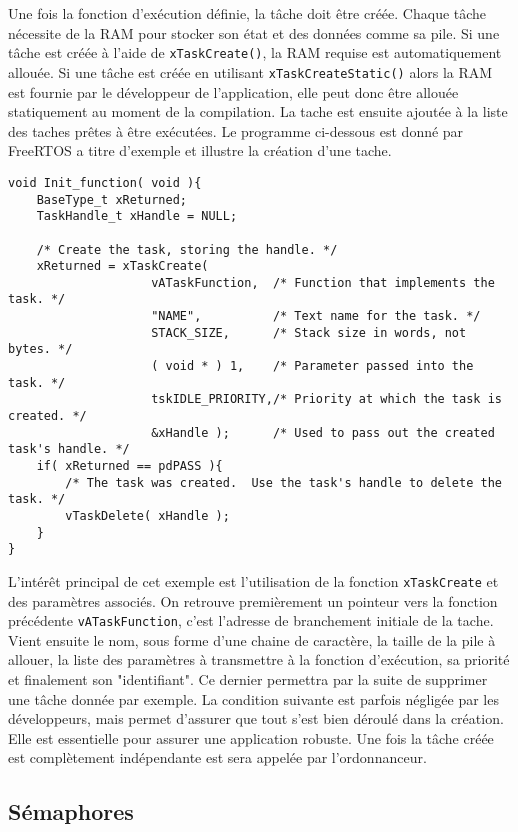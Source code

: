 Une fois la fonction d'exécution définie, la tâche doit être créée.
Chaque tâche nécessite de la RAM pour stocker son état et des données comme sa pile. 
Si une tâche est créée à l'aide de \texttt{xTaskCreate()}, la RAM requise est automatiquement allouée. 
Si une tâche est créée en utilisant \texttt{xTaskCreateStatic()} alors la RAM est fournie par le développeur de l'application, elle peut donc être allouée statiquement au moment de la compilation.
La tache est ensuite ajoutée à la liste des taches prêtes à être exécutées.
Le programme ci-dessous est donné par FreeRTOS \cite{web_freeRTOS_createTask} a titre d'exemple et illustre la création d'une tache.
\begin{lstlisting}[style=CStyle]
void Init_function( void ){
    BaseType_t xReturned;
    TaskHandle_t xHandle = NULL;

    /* Create the task, storing the handle. */
    xReturned = xTaskCreate(
                    vATaskFunction,  /* Function that implements the task. */
                    "NAME",          /* Text name for the task. */
                    STACK_SIZE,      /* Stack size in words, not bytes. */
                    ( void * ) 1,    /* Parameter passed into the task. */
                    tskIDLE_PRIORITY,/* Priority at which the task is created. */
                    &xHandle );      /* Used to pass out the created task's handle. */
    if( xReturned == pdPASS ){
        /* The task was created.  Use the task's handle to delete the task. */
        vTaskDelete( xHandle );
    }
}
\end{lstlisting}
L'intérêt principal de cet exemple est l'utilisation de la fonction \texttt{xTaskCreate} et des paramètres associés.
On retrouve premièrement un pointeur vers la fonction précédente \texttt{vATaskFunction}, c'est l'adresse de branchement initiale de la tache.
Vient ensuite le nom, sous forme d'une chaine de caractère, la taille de la pile à allouer, la liste des paramètres à transmettre à la fonction d'exécution, sa priorité et finalement son "identifiant".
Ce dernier permettra par la suite de supprimer une tâche donnée par exemple.
La condition suivante est parfois négligée par les développeurs, mais permet d'assurer que tout s'est bien déroulé dans la création.
Elle est essentielle pour assurer une application robuste.
Une fois la tâche créée est complètement indépendante est sera appelée par l'ordonnanceur.

\subsection{Sémaphores}

